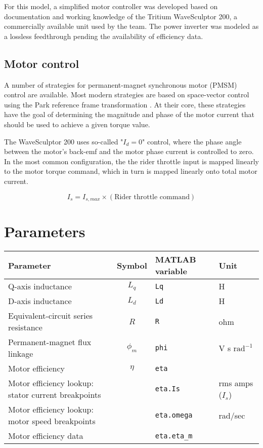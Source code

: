 \documentclass[../SimBALink.tex]{subfiles}
\begin{document}
	For this model, a simplified motor controller was developed based on documentation and working knowledge of the Tritium WaveSculptor 200, a commercially available unit used by the team. The power inverter was modeled as a lossless feedthrough pending the availability of efficiency data.
	
	\subsection{Motor control}
		A number of strategies for permanent-magnet synchronous motor (PMSM) control are available. Most modern strategies are based on space-vector control using the Park reference frame transformation \cite{Park1929}. At their core, these strategies have the goal of determining the magnitude and phase of the motor current that should be used to achieve a given torque value.
		
		The WaveSculptor 200 uses so-called "$I_d = 0$" control, where the phase angle between the motor's back-emf and the motor phase current is controlled to zero. In the most common configuration, the the rider throttle input is mapped linearly to the motor torque command, which in turn is mapped linearly onto total motor current.
		
		\begin{equation}
			I_s = I_{s,max} \times (\text{Rider throttle command})
		\end{equation}
		
		
\section{Parameters}
	
	\renewcommand{\arraystretch}{1.5}
	\begin{tabular}{ p{5cm} | c | l | l }
		Parameter					&	Symbol				&	MATLAB variable	&	Unit						\\\hline	
		Q-axis inductance				&	$L_q$				&	\texttt{Lq}			&	H			\\
		D-axis inductance				&	$L_d$				&	\texttt{Ld}			&	H			\\
		Equivalent-circuit series resistance	&	$R$					&	\texttt{R}			&	ohm			\\
		Permanent-magnet flux linkage	&	$\phi_m$				&	\texttt{phi}		&	V s $\text{rad}^{-1}$	\\
		Motor efficiency				&	$\eta$				&	\texttt{eta}		&				\\
		Motor efficiency lookup: stator current breakpoints	&			&	\texttt{eta.Is}		&	rms amps ($I_s$)	\\
		Motor efficiency lookup: motor speed breakpoints	&			&	\texttt{eta.omega}	& 	rad/sec		\\
		Motor efficiency data			&						&	\texttt{eta.eta\_m}	&	
	\end{tabular}
\end{document}
